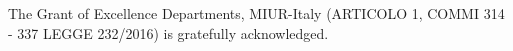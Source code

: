 \documentclass[journal=jacsat,manuscript=article]{achemso}
\begin{document}

\begin{acknowledgement}

The Grant of Excellence Departments, MIUR-Italy (ARTICOLO 1, COMMI 314 - 337 LEGGE 232/2016) is gratefully acknowledged.

\end{acknowledgement}

%
\end{document}
